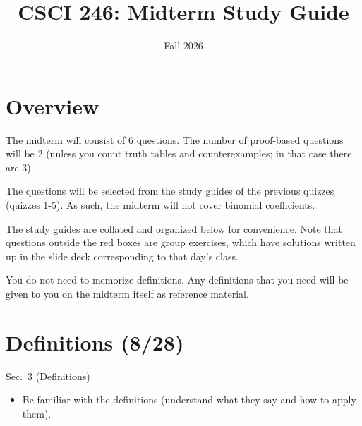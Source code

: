 \documentclass[11pt]{article}
\title{CSCI 246: Midterm Study Guide}
\author{}
\date{Fall 2026}
\begin{document}
\maketitle


\section*{Overview}

\hspace{1em} The midterm will consist of 6 questions.  The number of proof-based questions will be 2 (unless you count truth tables and counterexamples; in that case there are 3).  

The questions will be selected from the study guides of the previous quizzes (quizzes 1-5).  As such, the midterm will not cover binomial coefficients.

The study guides are  collated and organized below for convenience.   Note that questions outside the red boxes are group exercises, which have solutions written up in the slide deck corresponding to that day's class.

You do not need to memorize definitions. Any definitions that you need will be given to you on the midterm itself as reference material.

\section*{Definitions (8/28)}
\begin{textbook}{Sec.~3 (Definitions)}
\begin{itemize}[leftmargin=*, nosep]
\item Be familiar with the definitions (understand what they say and how to apply them).
\end{itemize}
\end{textbook}
\end{document}
